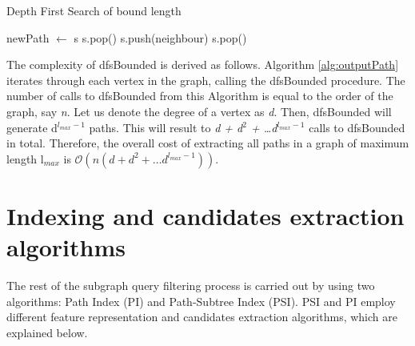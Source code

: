 \documentclass{l4proj}
\begin{document}
\begin{algorithm}
\centering
\caption{Depth First Search of bound length}
\label{alg:dfsBounded}
\begin{algorithmic}[1]
\State newPath  $\gets$ s  
\State {}
\EndIf
{}
\State s.pop()
\EndIf
{}
\State s.push(neighbour)
\State {} 
\EndIf
\EndFor
{} 
\State s.pop()
\EndIf
\EndProcedure
\end{algorithmic}
\end{algorithm}
The complexity of dfsBounded is derived as follows. Algorithm \ref{alg:outputPath} iterates through each vertex in the graph, calling the dfsBounded procedure. The number of calls to dfsBounded from this Algorithm is equal to the order of the graph, say \emph{n}. Let us denote the degree of a vertex as \emph{d}. Then, dfsBounded will generate d$^{l_{max}-1}$ paths. This will result to \emph{d + d$^{2}$ + \ldots d$^{l_{max}-1}$} calls to dfsBounded in total. Therefore, the overall cost of extracting all paths in a graph of maximum length l$_{max}$ is $\mathcal{O}(n(d + d^{2} + \ldots d^{l_{max}-1}))$.


\section{Indexing and candidates extraction algorithms}
\label{sec:PIandPSI}
The rest of the subgraph query filtering process is carried out by using two algorithms: Path Index (PI) and Path-Subtree Index (PSI). PSI and PI employ different feature representation and candidates extraction algorithms, which are explained below.
\end{document}
